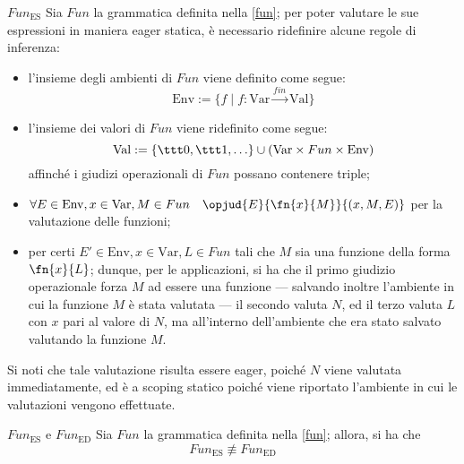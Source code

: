 \documentclass[a4paper, 12pt]{report}
\begin{document}
    \begin{framedprop}{$Fun_\mathrm{ES}$}
        Sia $Fun$ la grammatica definita nella \cref{fun}; per poter valutare le sue espressioni in maniera eager statica, è necessario ridefinire alcune regole di inferenza:

        \begin{itemize}
            \item l'insieme degli ambienti di $Fun$ viene definito come segue: $$\mathrm{Env} := \{f \mid f : \mathrm{Var} \xrightarrow{fin} \mathrm{Val}\}$$
            \item l'insieme dei valori di $Fun$ viene ridefinito come segue: $$\mathrm{Val} := \{ \ttt 0, \ttt 1, \ldots \} \cup (\mathrm{Var} \times Fun \times \mathrm{Env})$$ affinché i giudizi operazionali di $Fun$ possano contenere triple;
            \item $\forall E \in \mathrm{Env}, x \in \mathrm{Var}, M \in Fun \quad \opjud{E}{\fn{x}{M}}{(x,M,E)}$ per la valutazione delle funzioni;
            \item {} per certi $E' \in \mathrm{Env}, x \in \mathrm{Var}, L \in Fun$ tali che $M$ sia una funzione della forma $\fn{x}{L}$; dunque, per le applicazioni, si ha che il primo giudizio operazionale forza $M$ ad essere una funzione --- salvando inoltre l'ambiente in cui la funzione $M$ è stata valutata --- il secondo valuta $N$, ed il terzo valuta $L$ con $x$ pari al valore di $N$, ma all'interno dell'ambiente che era stato salvato valutando la funzione $M$.
        \end{itemize}

        Si noti che tale valutazione risulta essere eager, poiché $N$ viene valutata immediatamente, ed è a scoping statico poiché viene riportato l'ambiente in cui le valutazioni vengono effettuate.
    \end{framedprop}

    \begin{framedlem}[label={fun lemma pt1}]{$Fun_\mathrm{ES}$ e $Fun_\mathrm{ED}$}
        Sia $Fun$ la grammatica definita nella \cref{fun}; allora, si ha che $$Fun_\mathrm{ES} \not\equiv Fun_\mathrm{ED}$$
    \end{framedlem}
\end{document}
